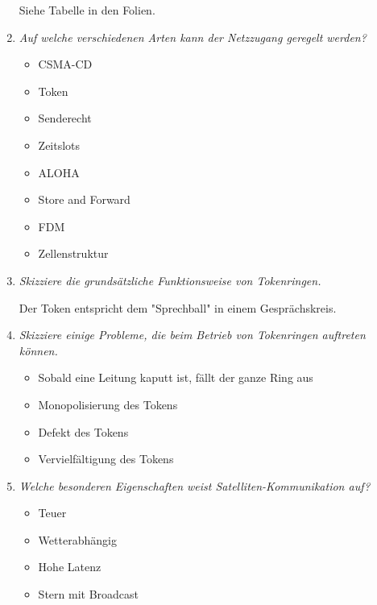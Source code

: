 \documentclass[hidelinks]{article}
\begin{document}
\begin{enumerate}
Siehe Tabelle in den Folien.

\item \textit{Auf welche verschiedenen Arten kann der Netzzugang geregelt werden?}
\begin{itemize}
\item CSMA-CD
\item Token
\item Senderecht
\item Zeitslots
\item ALOHA
\item Store and Forward
\item FDM
\item Zellenstruktur
\end{itemize}

\item \textit{Skizziere die grundsätzliche Funktionsweise von Tokenringen.}

Der Token entspricht dem "Sprechball" in einem Gesprächskreis.

\item \textit{Skizziere einige Probleme, die beim Betrieb von Tokenringen auftreten können.}
\begin{itemize}
\item Sobald eine Leitung kaputt ist, fällt der ganze Ring aus
\item Monopolisierung des Tokens
\item Defekt des Tokens
\item Vervielfältigung des Tokens
\end{itemize}

\item \textit{Welche besonderen Eigenschaften weist Satelliten-Kommunikation auf?}
\begin{itemize}
\item Teuer
\item Wetterabhängig
\item Hohe Latenz
\item Stern mit Broadcast
\end{itemize}
\end{enumerate}
\end{document}
